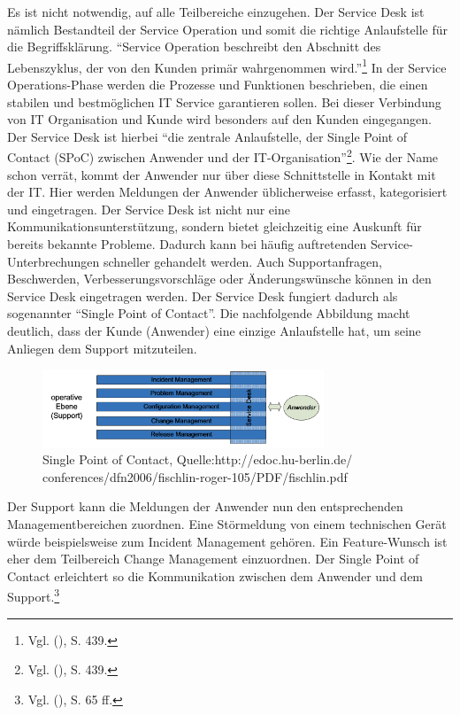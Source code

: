 \noindent
Es ist nicht notwendig, auf alle Teilbereiche einzugehen. Der Service Desk ist nämlich Bestandteil der Service Operation und somit die richtige Anlaufstelle für die Begriffsklärung. \newline \enquote{Service Operation beschreibt den Abschnitt des Lebenszyklus, der von den Kunden primär wahrgenommen wird.}\footnote{Vgl. \citeauthor{Ebel} (\citeyear{Ebel}), S. 439.} In der Service Operations-Phase werden die Prozesse und Funktionen beschrieben, die einen stabilen  und bestmöglichen IT Service garantieren sollen. Bei dieser Verbindung von IT Organisation und Kunde wird besonders auf den Kunden eingegangen. Der Service Desk ist hierbei \enquote{die zentrale Anlaufstelle, der Single Point of Contact (SPoC) zwischen Anwender und der IT-Organisation}\footnote{Vgl. \citeauthor{Ebel} (\citeyear{Ebel}), S. 439.}. Wie der Name schon verrät, kommt der Anwender nur über diese Schnittstelle in Kontakt mit der IT. Hier werden Meldungen der Anwender üblicherweise erfasst, kategorisiert und eingetragen. Der Service Desk ist nicht nur eine Kommunikationsunterstützung, sondern bietet gleichzeitig eine Auskunft für bereits bekannte Probleme. Dadurch kann bei häufig auftretenden Service-Unterbrechungen schneller gehandelt werden. Auch Supportanfragen, Beschwerden, Verbesserungsvorschläge oder Änderungswünsche können in den Service Desk eingetragen werden. Der Service Desk fungiert dadurch als sogenannter \enquote{Single Point of Contact}. Die nachfolgende Abbildung macht deutlich, dass der Kunde (Anwender) eine einzige Anlaufstelle hat, um seine Anliegen dem Support mitzuteilen. 

\begin{figure}[h!]
\centering
	\includegraphics[width=0.75\textwidth]{Abbildungen/SPOC_2.png}
	\caption[Single Point of Contact]{Single Point of Contact, Quelle:http://edoc.hu-berlin.de/
	conferences/dfn2006/fischlin-roger-105/PDF/fischlin.pdf}
	\label{fig:ITIL_Single_Point_of_Contact}
\end{figure}

\noindent
Der Support kann die Meldungen der Anwender nun den entsprechenden Managementbereichen zuordnen. Eine Störmeldung von einem technischen Gerät würde beispielsweise zum Incident Management gehören. Ein Feature-Wunsch ist eher dem Teilbereich Change Management einzuordnen. Der Single Point of Contact  erleichtert so die Kommunikation zwischen dem Anwender und dem Support.\footnote{Vgl. \citeauthor{Ebel} (\citeyear{Ebel}), S. 65 ff.}\\ 


